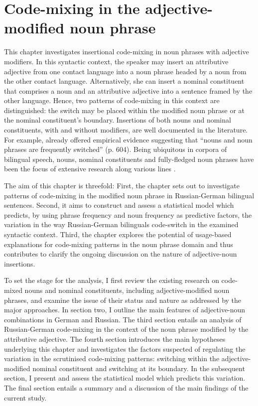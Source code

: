 \chapter{Code-mixing in the adjective-modified noun phrase}\label{NP}

This chapter investigates insertional code-mixing in noun phrases with adjective modifiers. In this syntactic context, the speaker may insert an attributive adjective from one contact language into a noun phrase headed by a noun from the other contact language. Alternatively, she can insert a nominal constituent that comprises a noun and an attributive adjective into a sentence framed by the other language. Hence, two patterns of code-mixing in this context are distinguished: the switch may be placed within the modified noun phrase or at the nominal constituent's boundary. Insertions of both nouns and nominal constituents, with and without modifiers, are well documented in the literature. For example, already \citet{poplack-sometimes-1980} offered empirical evidence suggesting that ``nouns and noun phrases are frequently switched'' (p. 604). Being ubiquitous in corpora of bilingual speech, nouns, nominal constituents and fully-fledged noun phrases have been the focus of extensive research along various lines \citep[e.g.,][]{sankoff-et-al-1990,poplack-meechan-1995, cantone-macswan,parafita-couto-et-al}.

The aim of this chapter is threefold: First, the chapter sets out to investigate patterns of code-mixing in the modified noun phrase in Russian-German bilingual sentences. Second, it aims to construct and assess a statistical model which predicts, by using phrase frequency and noun frequency as predictive factors, the variation in the way Russian-German bilinguals code-switch in the examined syntactic context. Third, the chapter explores the potential of usage-based explanations for code-mixing patterns in the noun phrase domain and thus contributes to clarify the ongoing discussion on the nature of adjective-noun insertions.

\begin{sloppypar}
To set the stage for the analysis, I first review the existing research on code-mixed nouns and nominal constituents, including adjective-modified noun phrases, and examine the issue of their status and nature as addressed by the major approaches. In section two, I outline the main features of adjective-noun combinations in German and Russian. The third section entails an analysis of Russian-German code-mixing in the context of the noun phrase modified by the attributive adjective. The fourth section introduces the main hypotheses underlying this chapter and investigates the factors suspected of regulating the variation in the scrutinised code-mixing patterns: switching within the adjective-modified nominal constituent and switching at its boundary. In the subsequent section, I present and assess the statistical model which predicts this variation. The final section entails a summary and a discussion of the main findings of the current study.
\end{sloppypar}

